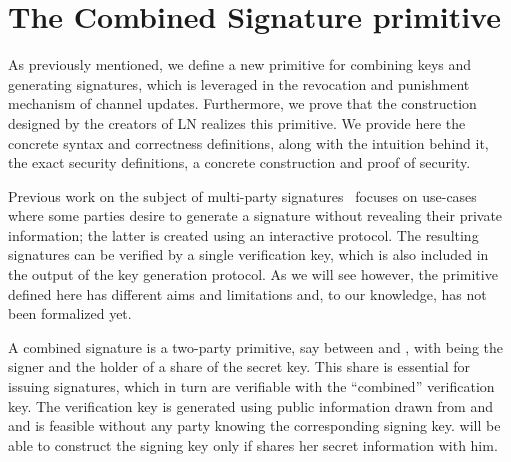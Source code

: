 \section{The Combined Signature primitive}
\label{sec:ov-combined-ds}
  As previously mentioned, we define a new primitive for combining keys and
  generating signatures, which is leveraged in the revocation and punishment
  mechanism of channel updates. Furthermore, we prove that the construction
  designed by the creators of LN realizes this primitive. We provide here the
  concrete syntax and correctness definitions, along with the intuition behind
  it, the exact security definitions, a concrete construction and proof of
   security.

  Previous work on the subject of multi-party
signatures~\cite{DBLP:conf/ndss/NicolosiKDM03,DBLP:journals/iacr/BellareS01,boyd1986digital,DBLP:conf/ndss/Ganesan95a,DBLP:conf/crypto/MacKenzieR01,ganesan1994secure}
  focuses on use-cases where some parties desire to generate a signature without
  revealing their private information; the latter is created using an
  interactive protocol. The resulting signatures can be verified by a single
  verification key, which is also included in the output of the key generation
  protocol. As we will see however, the primitive defined here has different
  aims and limitations and, to our knowledge, has not been formalized yet.

  A combined signature is a two-party primitive, say between \alice{}
  and \bob, with \bob{} being the signer and \alice{} the holder of a
  share of the secret key. This share is essential for issuing
  signatures, which in turn are verifiable with the ``combined''
  verification key. The verification key is generated using public
  information drawn from \alice{} and \bob{} and is feasible without any party
  knowing the corresponding signing key. \bob{} will be able to
  construct the signing key only if \alice{} shares her secret information with
  him.

